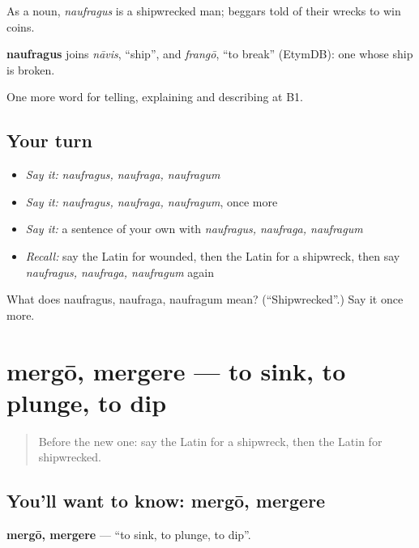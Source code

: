 As a noun, \emph{naufragus} is a shipwrecked man; beggars told of their wrecks to win coins.

\begin{cousinweb}
\textbf{naufragus} joins \emph{nāvis}, \textquotedblleft{}ship\textquotedblright{}, and \emph{frangō}, \textquotedblleft{}to break\textquotedblright{} (EtymDB): one whose ship is broken.
\end{cousinweb}

\begin{grammarlens}[title={What you've built}]
One more word for telling, explaining and describing at B1.
\end{grammarlens}

\subsection*{Your turn}
\begin{itemize}
\raggedright
  \item \emph{Say it:} \emph{naufragus, naufraga, naufragum}
  \item \emph{Say it:} \emph{naufragus, naufraga, naufragum}, once more
  \item \emph{Say it:} a sentence of your own with \emph{naufragus, naufraga, naufragum}
  \item \emph{Recall:} say the Latin for wounded, then the Latin for a shipwreck, then say \emph{naufragus, naufraga, naufragum} again
\end{itemize}

\begin{tcolorbox}[breakable,colback=teal!4,colframe=teal!35!black,title={Before you move on}]
What does naufragus, naufraga, naufragum mean? (\textquotedblleft{}Shipwrecked\textquotedblright{}.) Say it once more.
\end{tcolorbox}
\section[mergō, mergere]{mergō, mergere — to sink, to plunge, to dip}

\label{lesson:LA-C315-mergo}



\begin{quote}
Before the new one: say the Latin for a shipwreck, then the Latin for shipwrecked.
\end{quote}

\subsection*{You'll want to know: mergō, mergere}
\textbf{mergō, mergere} — \textquotedblleft{}to sink, to plunge, to dip\textquotedblright{}.

